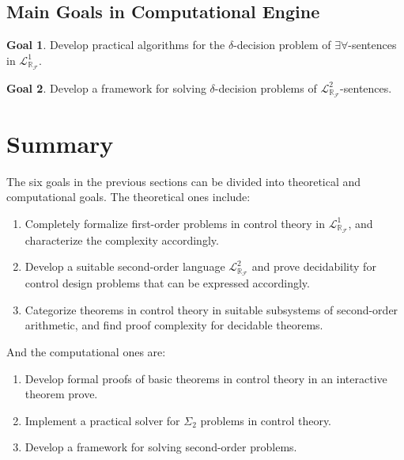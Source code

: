 \documentclass[11pt]{article}
\newcommand{\lrf}{\mathcal{L}_{\mathbb{R}_{\mathcal{F}}}}
\theoremstyle{definition}
\newtheorem{goal}{Goal}
\begin{document}
\subsection{Main Goals in Computational Engine}
\begin{goal}
Develop practical algorithms for the $\delta$-decision problem of $\exists\forall$-sentences in $\lrf^1$.
\end{goal}
\begin{goal}
Develop a framework for solving $\delta$-decision problems of $\lrf^2$-sentences.
\end{goal}
\section{Summary}\label{summary}

The six goals in the previous sections can be divided into theoretical and computational goals. The theoretical ones include:
\begin{enumerate}
\item Completely formalize first-order problems in control theory in $\lrf^1$, and characterize the complexity accordingly. 
\item Develop a suitable second-order language $\lrf^2$ and prove decidability for control design problems that can be expressed accordingly. 
\item Categorize theorems in control theory in suitable subsystems of second-order arithmetic, and find proof complexity for decidable theorems. 
\end{enumerate}
And the computational ones are:
\begin{enumerate}
\item Develop formal proofs of basic theorems in control theory in an interactive theorem prove.
\item Implement a practical solver for $\Sigma_2$ problems in control theory. 
\item Develop a framework for solving second-order problems. 
\end{enumerate}


\end{document}
